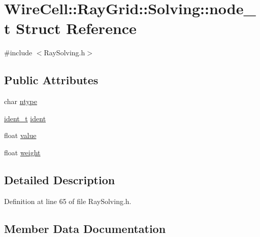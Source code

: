\hypertarget{struct_wire_cell_1_1_ray_grid_1_1_solving_1_1node__t}{}\section{Wire\+Cell\+:\+:Ray\+Grid\+:\+:Solving\+:\+:node\+\_\+t Struct Reference}
\label{struct_wire_cell_1_1_ray_grid_1_1_solving_1_1node__t}


{\ttfamily \#include $<$Ray\+Solving.\+h$>$}

\subsection*{Public Attributes}
\begin{DoxyCompactItemize}
\item 
char \hyperlink{struct_wire_cell_1_1_ray_grid_1_1_solving_1_1node__t_a85ecb4087c859035dd55d31dd42d954a}{ntype}
\item 
\hyperlink{class_wire_cell_1_1_ray_grid_1_1_solving_af2a71a899a5b0daceaec23b9acf12b91}{ident\+\_\+t} \hyperlink{struct_wire_cell_1_1_ray_grid_1_1_solving_1_1node__t_a4e9b8da660307ed93889dc1f9865d894}{ident}
\item 
float \hyperlink{struct_wire_cell_1_1_ray_grid_1_1_solving_1_1node__t_aa16b95f4cfa20055ccdaf8b973d811c0}{value}
\item 
float \hyperlink{struct_wire_cell_1_1_ray_grid_1_1_solving_1_1node__t_a8e8925bdd931ad2b979bdb3e6c4b0ecd}{weight}
\end{DoxyCompactItemize}


\subsection{Detailed Description}


Definition at line 65 of file Ray\+Solving.\+h.



\subsection{Member Data Documentation}
\mbox{\label{struct_wire_cell_1_1_ray_grid_1_1_solving_1_1node__t_a4e9b8da660307ed93889dc1f9865d894}} 
